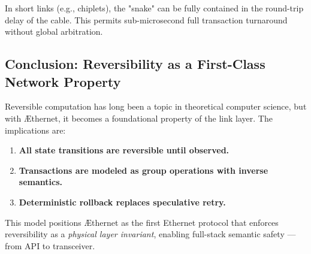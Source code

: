 \documentclass[../../../OAE-SPEC-MAIN.tex]{subfiles}
\begin{document}
In short links (e.g., chiplets), the "snake" can be fully contained in the round-trip delay of the cable. This permits sub-microsecond full transaction turnaround without global arbitration.

\subsection*{Conclusion: Reversibility as a First-Class Network Property}

Reversible computation has long been a topic in theoretical computer science, but with \AE thernet, it becomes a foundational property of the link layer. The implications are:

\begin{enumerate}
  \item \textbf{All state transitions are reversible until observed.}
  \item \textbf{Transactions are modeled as group operations with inverse semantics.}
  \item \textbf{Deterministic rollback replaces speculative retry.}
\end{enumerate}

This model positions \AE thernet as the first Ethernet protocol that enforces reversibility as a \emph{physical layer invariant}, enabling full-stack semantic safety — from API to transceiver.
\end{document}
